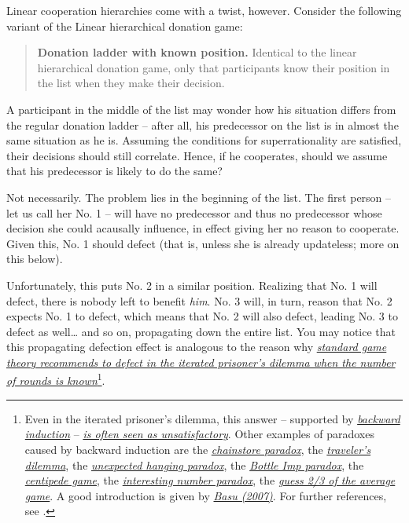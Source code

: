Linear cooperation hierarchies come with a twist, however. Consider the
following variant of the Linear hierarchical donation game:

\begin{quote}
\textbf{Donation ladder with known position.} Identical to the linear
hierarchical donation game, only that participants know their position
in the list when they make their decision.
\end{quote}

A participant in the middle of the list may wonder how his situation
differs from the regular donation ladder -- after all, his predecessor
on the list is in almost the same situation as he is. Assuming the
conditions for superrationality are satisfied, their decisions should
still correlate. Hence, if he cooperates, should we assume that his
predecessor is likely to do the same?

Not necessarily. The problem lies in the beginning of the list. The
first person -- let us call her No. 1 -- will have no predecessor and
thus no predecessor whose decision she could acausally influence, in
effect giving her no reason to cooperate. Given this, No. 1 should
defect (that is, unless she is already updateless; more on this below).

Unfortunately, this puts No. 2 in a similar position. Realizing that No.
1 will defect, there is nobody left to benefit \emph{him}. No. 3 will,
in turn, reason that No. 2 expects No. 1 to defect, which means that No.
2 will also defect, leading No. 3 to defect as well\ldots{} and so on,
propagating down the entire list. You may notice that this propagating
defection effect is analogous to the reason why
\href{https://en.wikipedia.org/wiki/Prisoner\%27s_dilemma\#The_iterated_prisoner.27s_dilemma}{\emph{standard
game theory recommends to defect in the iterated prisoner's dilemma when
the number of rounds is known}}\footnote{Even in the iterated prisoner's
  dilemma, this answer -- supported by
  \href{https://en.wikipedia.org/wiki/Backward_induction}{\emph{backward
  induction}} --
  \href{http://lesswrong.com/lw/to/the_truly_iterated_prisoners_dilemma/n23}{\emph{is
  often seen as unsatisfactory}}. Other examples of paradoxes caused by
  backward induction are the
  \href{https://en.wikipedia.org/wiki/Chainstore_paradox}{\emph{chainstore
  paradox}}, the
  \href{https://en.wikipedia.org/wiki/Traveler\%27s_dilemma}{\emph{traveler's
  dilemma}}, the
  \href{https://en.wikipedia.org/wiki/Unexpected_hanging_paradox}{\emph{unexpected
  hanging paradox}}, the
  \href{https://en.wikipedia.org/wiki/The_Bottle_Imp\#Bottle_Imp_paradox}{\emph{Bottle
  Imp paradox}}, the
  \href{https://en.wikipedia.org/wiki/Centipede_game}{\emph{centipede
  game}}, the
  \href{https://en.wikipedia.org/wiki/Interesting_number_paradox}{\emph{interesting
  number paradox}}, the
  \href{https://en.wikipedia.org/wiki/Guess_2/3_of_the_average}{\emph{guess
  2/3 of the average game}}. A good introduction is given by
  \href{http://www.cs.virginia.edu/~robins/The_Travelers_Dilemma.pdf}{\emph{Basu
  (2007)}}. For further references, see
  \parencite{Basu1994-xk}.}.

